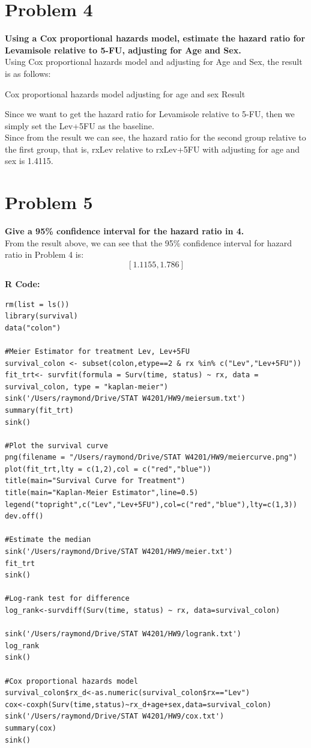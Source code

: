 \documentclass[10pt,letterpaper]{article}
\begin{document}
\section*{Problem 4}
\textbf{Using a Cox proportional hazards model, estimate the hazard ratio for Levamisole relative to 5-FU, adjusting for Age and Sex.}\\

Using Cox proportional hazards model and adjusting for Age and Sex, the result is as follows:
\begin{center}
\small{Cox proportional hazards model adjusting for age and sex Result}
\end{center}
Since we want to get the hazard ratio for Levamisole relative to 5-FU, then we simply set the Lev+5FU as the baseline.\\

Since from the result we can see, the hazard ratio for the second group relative to the first group, that is, rxLev relative to rxLev+5FU with adjusting for age and sex is 1.4115.
\section*{Problem 5}
\textbf{Give a 95\% confidence interval for the hazard ratio in 4.}\\

From the result above, we can see that the 95\% confidence interval for hazard ratio in Problem 4 is: \[[1.1155 , 1.786]\] 

\newpage
\textbf{R Code:}
\begin{lstlisting}
rm(list = ls())
library(survival)
data("colon")

#Meier Estimator for treatment Lev, Lev+5FU
survival_colon <- subset(colon,etype==2 & rx %in% c("Lev","Lev+5FU"))
fit_trt<- survfit(formula = Surv(time, status) ~ rx, data = survival_colon, type = "kaplan-meier")
sink('/Users/raymond/Drive/STAT W4201/HW9/meiersum.txt')
summary(fit_trt)
sink()

#Plot the survival curve
png(filename = "/Users/raymond/Drive/STAT W4201/HW9/meiercurve.png")
plot(fit_trt,lty = c(1,2),col = c("red","blue"))
title(main="Survival Curve for Treatment")
title(main="Kaplan-Meier Estimator",line=0.5)
legend("topright",c("Lev","Lev+5FU"),col=c("red","blue"),lty=c(1,3))
dev.off()

#Estimate the median
sink('/Users/raymond/Drive/STAT W4201/HW9/meier.txt')
fit_trt
sink()

#Log-rank test for difference
log_rank<-survdiff(Surv(time, status) ~ rx, data=survival_colon)

sink('/Users/raymond/Drive/STAT W4201/HW9/logrank.txt')
log_rank
sink()

#Cox proportional hazards model
survival_colon$rx_d<-as.numeric(survival_colon$rx=="Lev")
cox<-coxph(Surv(time,status)~rx_d+age+sex,data=survival_colon)
sink('/Users/raymond/Drive/STAT W4201/HW9/cox.txt')
summary(cox)
sink()

\end{lstlisting}
\end{document}
